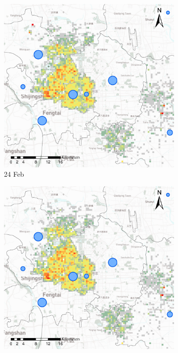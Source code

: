 \documentclass[preprints,ijgi,submit,moreauthors]{Definitions/mdpi}
\begin{document}
\begin{figure}[ht]
    \vspace{6pt}
    \begin{subfigure}{.3\textwidth}
        \includegraphics[width=\textwidth]{Figures/Relation_with_confrimed_cases/NewDistrictSSBD2020_02_24.eps}
        \caption{24 Feb}\label{fig:correlation_02_24}
    \end{subfigure}
    \begin{subfigure}{.3\textwidth}
        \includegraphics[width=\textwidth]{Figures/Relation_with_confrimed_cases/NewDistrictSSBD2020_02_28.eps}

\end{subfigure}
\end{figure}
\end{document}
